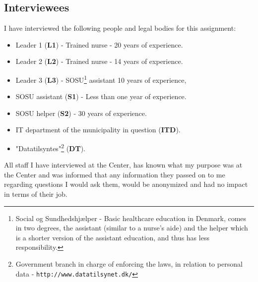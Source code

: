 \documentclass[11pt]{article}
\begin{document}
\subsection{Interviewees}
I have interviewed the following people and legal bodies for this assignment:
\begin{itemize}
\item Leader 1 (\textbf{L1}) - Trained nurse - 20 years of experience.
\item Leader 2 (\textbf{L2}) - Trained nurse - 14 years of experience.
\item Leader 3 (\textbf{L3}) - SOSU\footnote{Social og Sundhedshjælper - Basic healthcare education in Denmark, comes in two degrees, the assistant (similar to a nurse's aide) and the helper which is a shorter version of the assistant education, and thus has less responsibility.} assistant 10 years of experience,
\item SOSU assistant (\textbf{S1}) - Less than one year of experience.
\item SOSU helper (\textbf{S2}) - 30 years of experience.
\item IT department of the municipality in question (\textbf{ITD}).
\item "Datatilsyntes"\footnote{Government branch in charge of enforcing the laws, in relation to personal data - \texttt{http://www.datatilsynet.dk/}} (\textbf{DT}).
\end{itemize}

All staff I have interviewed at the Center, has known what my purpose was at the Center and was informed that any information they passed on to me regarding questions I would ask them, would be anonymized and had no impact in terms of their job.
\pagebreak
\end{document}
